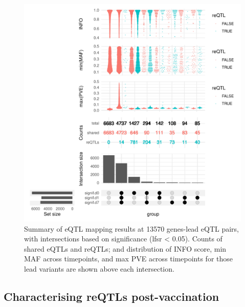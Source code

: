 \begin{figure}
    \centering
    \includegraphics[width=1.0\textwidth]{mainmatter/figures/chapter_03/compare_dge_eqtl.upset.pdf}
    \caption{
        Summary of eQTL mapping results at 13570 genes-lead eQTL pairs,
        with intersections based on significance (lfsr < 0.05).
        Counts of shared eQTLs and reQTLs; and distribution of INFO score, min MAF across timepoints, and max PVE across timepoints for those lead variants are shown above each intersection.
    }
    \label{fig:hird_eQTL_upset_mega}
\end{figure}

\subsection{Characterising reQTLs post-vaccination}

